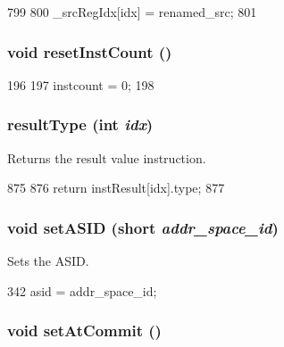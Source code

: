 \begin{DoxyCode}
799     {
800         _srcRegIdx[idx] = renamed_src;
801     }
\end{DoxyCode}
\hypertarget{classInOrderDynInst_a01acb977c624a165628ca1543bf9b4db}{
\subsubsection[{resetInstCount}]{\setlength{\rightskip}{0pt plus 5cm}void resetInstCount ()}}
\label{classInOrderDynInst_a01acb977c624a165628ca1543bf9b4db}



\begin{DoxyCode}
196 {
197     instcount = 0;
198 }
\end{DoxyCode}
\hypertarget{classInOrderDynInst_ac7c22f0fa3a2730e7dd23e7be39a3d36}{
\subsubsection[{resultType}]{ resultType (int {\em idx})}}
\label{classInOrderDynInst_ac7c22f0fa3a2730e7dd23e7be39a3d36}
Returns the result value instruction. 


\begin{DoxyCode}
875     {
876         return instResult[idx].type;
877     }
\end{DoxyCode}
\hypertarget{classInOrderDynInst_a0038e061ac1af4a45f8d301673483cd0}{
\subsubsection[{setASID}]{\setlength{\rightskip}{0pt plus 5cm}void setASID (short {\em addr\_\-space\_\-id})}}
\label{classInOrderDynInst_a0038e061ac1af4a45f8d301673483cd0}
Sets the ASID. 


\begin{DoxyCode}
342 { asid = addr_space_id; }
\end{DoxyCode}
\hypertarget{classInOrderDynInst_adef575a8b55171e005db4954a44e5caf}{
\subsubsection[{setAtCommit}]{\setlength{\rightskip}{0pt plus 5cm}void setAtCommit ()}}
\label{classInOrderDynInst_adef575a8b55171e005db4954a44e5caf}



